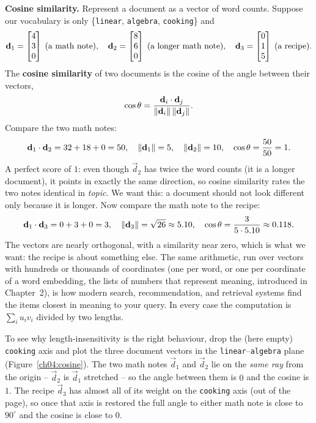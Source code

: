 \begin{applicationbox}
\textbf{Cosine similarity.} Represent a document as a vector of word counts. Suppose
our vocabulary is only \{\texttt{linear}, \texttt{algebra}, \texttt{cooking}\} and
\[
  \mathbf{d}_1 = \begin{bmatrix}4\\3\\0\end{bmatrix}\;(\text{a math note}),\quad
  \mathbf{d}_2 = \begin{bmatrix}8\\6\\0\end{bmatrix}\;(\text{a longer math note}),\quad
  \mathbf{d}_3 = \begin{bmatrix}0\\1\\5\end{bmatrix}\;(\text{a recipe}).
\]
The \textbf{cosine similarity} of two documents is the cosine of the angle between
their vectors,
\[
  \cos\theta = \frac{\mathbf{d}_i\cdot\mathbf{d}_j}{\lVert\mathbf{d}_i\rVert\,\lVert\mathbf{d}_j\rVert}.
\]
Compare the two math notes:
\[
  \mathbf{d}_1\cdot\mathbf{d}_2 = 32 + 18 + 0 = 50, \quad
  \lVert\mathbf{d}_1\rVert = 5,\quad \lVert\mathbf{d}_2\rVert=10,\quad
  \cos\theta = \frac{50}{50} = 1.
\]
A perfect score of $1$: even though $\vec d_2$ has twice the word counts (it is
a longer document), it points in exactly the same direction, so cosine
similarity rates the two notes identical in \emph{topic}. We want this: a document
should not look different only because it is longer. Now compare the math note to
the recipe:
\[
  \mathbf{d}_1\cdot\mathbf{d}_3 = 0 + 3 + 0 = 3,\quad
  \lVert\mathbf{d}_3\rVert = \sqrt{26}\approx 5.10,\quad
  \cos\theta = \frac{3}{5\cdot 5.10}\approx 0.118.
\]
The vectors are nearly orthogonal, with a similarity near zero, which is what we
want: the recipe is about something else. The same arithmetic, run over vectors with
hundreds or thousands of coordinates (one per word, or one per coordinate of a word
embedding, the lists of numbers that represent meaning, introduced in Chapter~2), is
how modern search, recommendation, and retrieval systems find the items closest in
meaning to your query. In every case the computation is $\sum_i u_iv_i$ divided by
two lengths.
\end{applicationbox}

To see why length-insensitivity is the right behaviour, drop the (here empty)
\texttt{cooking} axis and plot the three document vectors in the
\texttt{linear}--\texttt{algebra} plane (Figure~\ref{ch04:cosine}). The two math
notes $\vec d_1$ and $\vec d_2$ lie on the \emph{same ray} from the origin --
$\vec d_2$ is $\vec d_1$ stretched -- so the angle between them is $0$ and the
cosine is $1$. The recipe $\vec d_3$ has almost all of its weight on the
\texttt{cooking} axis (out of the page), so once that axis is restored the full
angle to either math note is close to $90^\circ$ and the cosine is close to $0$.

